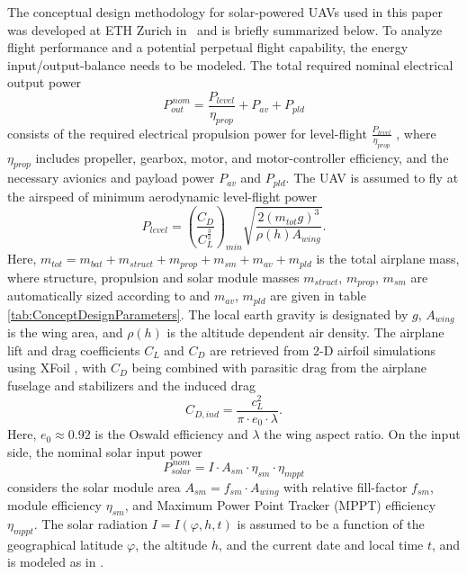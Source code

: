 The conceptual design methodology for solar-powered UAVs used in this paper was developed at ETH Zurich in~\cite{Noth_PhD,Leutenegger_JIRS} and is briefly summarized below. To analyze flight performance and a potential perpetual flight capability, the energy input/output-balance needs to be modeled. The total required nominal electrical output power
\begin{equation} \label{eqn:P_out}
P_{out}^{\,nom}=\frac{P_{level}}{\eta_{prop}}+P_{av}+P_{pld}
\end{equation}
consists of the required electrical propulsion power for level-flight $\frac{P_{level}}{\eta_{prop}}$ , where $\eta_{prop}$ includes propeller, gearbox, motor, and motor-controller efficiency, and the necessary avionics and payload power $P_{av}$ and $P_{pld}$. The UAV is assumed to fly at the airspeed of minimum aerodynamic level-flight power
\begin{equation} \label{eqn:P_level}
P_{level}=\left(\frac{C_D}{C_L^\frac{3}{2}}\right)_{min}\sqrt{\frac{2(m_{tot}g)^3}{\rho(h)A_{wing}}} .
\end{equation}
Here, $m_{tot}=m_{bat}+m_{struct}+m_{prop}+m_{sm}+m_{av}+m_{pld}$ is the total airplane mass, where structure, propulsion and solar module masses $m_{struct}$, $m_{prop}$, $m_{sm}$ are automatically sized according to \cite{Noth_PhD,Leutenegger_JIRS} and $m_{av}$, $m_{pld}$ are given in table \ref{tab:ConceptDesignParameters}. The local earth gravity is designated by $g$, $A_{wing}$ is the wing area, and $\rho(h)$ is the altitude dependent air density. The airplane lift and drag coefficients $C_L$ and $C_D$ are retrieved from 2-D airfoil simulations using XFoil \cite{Drela_XFoil}, with $C_D$ being combined with parasitic drag from the airplane fuselage and stabilizers and the induced drag  
\begin{equation} \label{eqn:C_D}
C_{D,ind}=\frac{c_L^2}{\pi\cdot e_0\cdot\lambda} .
\end{equation}
Here, $e_0\approx0.92$ is the Oswald efficiency and $\lambda$ the wing aspect ratio. On the input side, the nominal solar input power
\begin{equation} \label{eqn:P_solar}
P_{solar}^{\,nom}=I\cdot A_{sm}\cdot\eta_{sm}\cdot\eta_{mppt}
\end{equation}
considers the solar module area $A_{sm}=f_{sm}\cdot A_{wing}$ with relative fill-factor $f_{sm}$, module efficiency $\eta_{sm}$, and Maximum Power Point Tracker (MPPT) efficiency $\eta_{mppt}$. The solar radiation $I=I(\varphi,h,t)$ is assumed to be a function of the geographical latitude $\varphi$, the altitude $h$, and the current date and local time $t$, and is modeled as in \cite{Duffie_SolarEngineering}.

